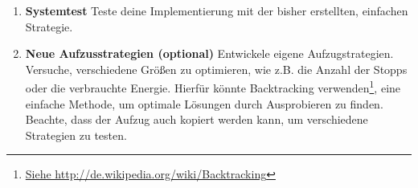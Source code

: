\begin{enumerate}
\begin{algorithm}[H]
{   Move Elevator to next floor; \\
   Let all arrived people off; \\
   Let all people on floor into Elevator;\\
 }
\end{algorithm}

\item \textbf{Systemtest} 
Teste deine Implementierung mit der bisher erstellten, einfachen Strategie.

\item \textbf{Neue Aufzusstrategien (optional)}
Entwickele eigene Aufzugstrategien. 
Versuche, verschiedene Größen zu optimieren, wie z.B. die Anzahl der Stopps oder die verbrauchte Energie.
Hierfür könnte Backtracking verwenden\footnote{\url{Siehe http://de.wikipedia.org/wiki/Backtracking}}, eine einfache Methode, um optimale Lösungen durch Ausprobieren zu finden. Beachte, dass der Aufzug auch kopiert werden kann, um verschiedene Strategien zu testen.

\end{enumerate}


